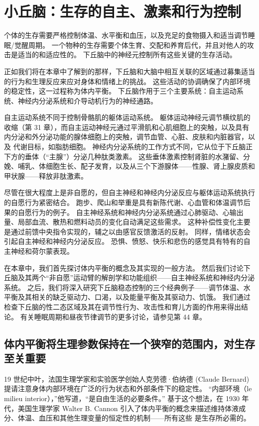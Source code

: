 \chapter{小丘脑：生存的自主、激素和行为控制}
个体的生存需要严格控制体温、水平衡和血压，以及充足的食物摄入和适当调节睡眠/觉醒周期。 一个物种的生存需要个体生育、交配和养育后代，并且对他人的攻击是适当的和适应性的。 下丘脑中的神经元控制所有这些关键的生存活动。

正如我们将在本章中了解到的那样，下丘脑和大脑中相互关联的区域通过募集适当的行为和生理反应来应对身体和情绪上的挑战。 这些活动的协调确保了内部环境的稳定性，这一过程称为体内平衡。 下丘脑作用于三个主要系统：自主运动系统、神经内分泌系统和介导动机行为的神经通路。

自主运动系统不同于控制骨骼肌的躯体运动系统。 躯体运动神经元调节横纹肌的收缩（第 31 章），而自主运动神经元通过平滑肌和心肌细胞上的突触，以及具有内分泌和外分泌功能的腺体细胞上的突触，调节血管、心脏、皮肤和内脏器官，以及 代谢目标，如脂肪细胞。 神经内分泌系统的工作方式不同，它从位于下丘脑正下方的垂体（“主腺”）分泌几种肽类激素。 这些垂体激素控制肾脏的水潴留、分娩、哺乳、体细胞生长、配子发育，以及从三个下游腺体——性腺、肾上腺皮质和甲状腺——释放非肽激素。

尽管在很大程度上是非自愿的，但自主神经和神经内分泌反应与躯体运动系统执行的自愿行为紧密结合。 跑步、爬山和举重是具有新陈代谢、心血管和体温调节后果的自愿行为的例子。 自主神经系统和神经内分泌系统通过心肺驱动、心输出量、局部血流、散热和燃料动员的变化自动满足这些需求。 这种补偿性变化主要是通过前馈中央指令实现的，辅之以由感官反馈激活的反射。 同样，情绪状态会引起自主神经和神经内分泌反应。 恐惧、愤怒、快乐和悲伤的感觉具有特有的自主神经和荷尔蒙表现。

在本章中，我们首先探讨体内平衡的概念及其实现的一般方法。 然后我们讨论下丘脑及其两个“非自愿”运动臂的解剖学和功能组织——自主神经系统和神经内分泌系统。 之后，我们将深入研究下丘脑稳态控制的三个经典例子——调节体温、水平衡及其相关的缺乏驱动力、口渴，以及能量平衡及其驱动力、饥饿。 我们通过检查下丘脑的性二态区域及其在调节性行为、攻击性和育儿方面的作用来得出结论。 有关睡眠周期和昼夜节律调节的更多讨论，请参见第 44 章。

\section{体内平衡将生理参数保持在一个狭窄的范围内，对生存至关重要}

19 世纪中叶，法国生理学家和实验医学创始人克劳德·伯纳德 (Claude Bernard) 提请注意身体内部环境在广泛的行为状态和外部条件下的稳定性。 “内部环境（le milieu interior），”他写道，“是自由生活的必要条件。” 基于这个想法，在 1930 年代，美国生理学家 Walter B. Cannon 引入了体内平衡的概念来描述维持体液成分、体温、血压和其他生理变量的恒定性的机制——所有这些 是生存所必需的。

